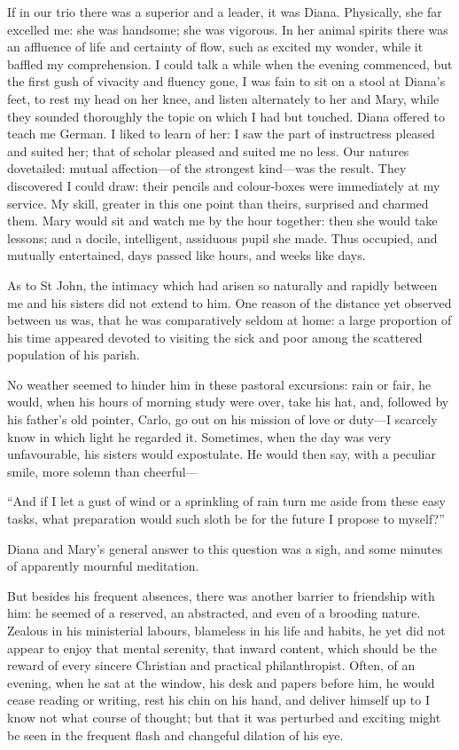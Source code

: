 If in our trio there was a superior and a leader, it was Diana.
Physically, she far excelled me: she was handsome; she was vigorous. In
her animal spirits there was an affluence of life and certainty of flow,
such as excited my wonder, while it baffled my comprehension. I could
talk a while when the evening commenced, but the first gush of vivacity
and fluency gone, I was fain to sit on a stool at Diana's feet, to rest
my head on her knee, and listen alternately to her and Mary, while they
sounded thoroughly the topic on which I had but touched. Diana offered
to teach me German. I liked to learn of her: I saw the part of
instructress pleased and suited her; that of scholar pleased and suited
me no less. Our natures dovetailed: mutual affection---of the strongest
kind---was the result. They discovered I could draw: their pencils and
colour-boxes were immediately at my service. My skill, greater in this
one point than theirs, surprised and charmed them. Mary would sit and
watch me by the hour together: then she would take lessons; and a
docile, intelligent, assiduous pupil she made. Thus occupied, and
mutually entertained, days passed like hours, and weeks like days.

As to \Mr{} St John, the intimacy which had arisen so naturally and
rapidly between me and his sisters did not extend to him. One reason of
the distance yet observed between us was, that he was comparatively
seldom at home: a large proportion of his time appeared devoted to
visiting the sick and poor among the scattered population of his parish.

No weather seemed to hinder him in these pastoral excursions: rain or
fair, he would, when his hours of morning study were over, take his hat,
and, followed by his father's old pointer, Carlo, go out on his mission
of love or duty---I scarcely know in which light he regarded it.
Sometimes, when the day was very unfavourable, his sisters would
expostulate. He would then say, with a peculiar smile, more solemn than
cheerful---

\enquote{And if I let a gust of wind or a sprinkling of rain turn me
	aside from these easy tasks, what preparation would such sloth be for
	the future I propose to myself?}

Diana and Mary's general answer to this question was a sigh, and some
minutes of apparently mournful meditation.

But besides his frequent absences, there was another barrier to
friendship with him: he seemed of a reserved, an abstracted, and even of
a brooding nature. Zealous in his ministerial labours, blameless in his
life and habits, he yet did not appear to enjoy that mental serenity,
that inward content, which should be the reward of every sincere
Christian and practical philanthropist. Often, of an evening, when he
sat at the window, his desk and papers before him, he would cease
reading or writing, rest his chin on his hand, and deliver himself up to
I know not what course of thought; but that it was perturbed and
exciting might be seen in the frequent flash and changeful dilation of
his eye.

